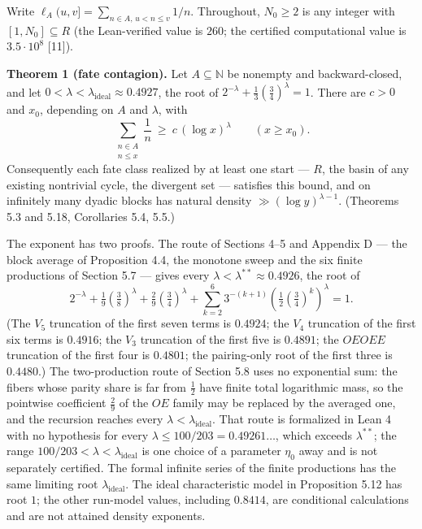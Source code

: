 \documentclass[11pt,a4paper]{article}
\begin{document}
Write \(\ell_A(u,v]=\sum_{n\in A,\,u<n\le v}1/n\). Throughout,
\(N_0\ge2\) is any integer with \([1,N_0]\subseteq R\) (the
Lean-verified value is \(260\); the certified computational value is
\(3.5\cdot 10^8\) {[}11{]}).

\textbf{Theorem 1 (fate contagion).} Let \(A\subseteq\mathbb N\) be
nonempty and backward-closed, and let
\(0<\lambda<\lambda_{\mathrm{ideal}}\approx0.4927\), the root of
\(2^{-\lambda}+\tfrac13(\tfrac34)^\lambda=1\). There are \(c>0\) and
\(x_0\), depending on \(A\) and \(\lambda\), with \[
\sum_{\substack{n\in A\\ n\le x}}\frac1n\ \ge\ c\,(\log x)^{\lambda}
\qquad(x\ge x_0).
\] Consequently each fate class realized by at least one start ---
\(R\), the basin of any existing nontrivial cycle, the divergent set ---
satisfies this bound, and on infinitely many dyadic blocks has natural
density \(\gg(\log y)^{\lambda-1}\). (Theorems 5.3 and 5.18, Corollaries
5.4, 5.5.)

The exponent has two proofs. The route of Sections 4--5 and Appendix D
--- the block average of Proposition 4.4, the monotone sweep and the six
finite productions of Section 5.7 --- gives every
\(\lambda<\lambda^{**}\approx0.4926\), the root of \[
2^{-\lambda}+\tfrac19(\tfrac38)^\lambda+\tfrac29(\tfrac34)^\lambda
 +\sum_{k=2}^{6}3^{-(k+1)}\left(\tfrac12(\tfrac34)^k\right)^\lambda=1.
\tag{1.1}
\] (The \(V_5\) truncation of the first seven terms is \(0.4924\); the
\(V_4\) truncation of the first six terms is \(0.4916\); the \(V_3\)
truncation of the first five is \(0.4891\); the \(OEOEE\) truncation of
the first four is \(0.4801\); the pairing-only root of the first three
is \(0.4480\).) The two-production route of Section 5.8 uses no
exponential sum: the fibers whose parity share is far from \(\tfrac12\)
have finite total logarithmic mass, so the pointwise coefficient
\(\tfrac29\) of the \(OE\) family may be replaced by the averaged one,
and the recursion reaches every \(\lambda<\lambda_{\mathrm{ideal}}\).
That route is formalized in Lean 4 with no hypothesis for every
\(\lambda\le100/203=0.49261\ldots\), which exceeds \(\lambda^{**}\); the
range \(100/203<\lambda<\lambda_{\mathrm{ideal}}\) is one choice of a
parameter \(\eta_0\) away and is not separately certified. The formal
infinite series of the finite productions has the same limiting root
\(\lambda_{\mathrm{ideal}}\). The ideal characteristic model in
Proposition 5.12 has root \(1\); the other run-model values, including
\(0.8414\), are conditional calculations and are not attained density
exponents.
\end{document}
